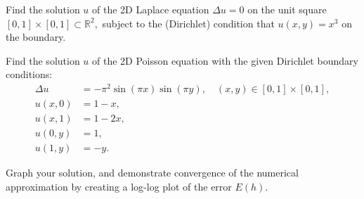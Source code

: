 % 
% 

\begin{problem}
	Find the solution $u$ of the 2D Laplace equation $\Delta u = 0$ on the unit 
	square $[0,1]\times [0,1] \subset \mathbb{R}^2,$ subject to the (Dirichlet) condition that 
	$u(x,y) = x^3$ on the boundary. 
\end{problem}

\begin{problem}
	Find the solution $u$ of the 2D Poisson equation with the given Dirichlet boundary conditions:
	\begin{align*}
		\Delta u &= -\pi^2 \sin(\pi x)\sin(\pi y), \quad (x,y) \in [0,1]\times [0,1], \\
		u(x,0) &= 1-x, \\
		u(x,1) &= 1-2x, \\
		u(0,y) &= 1, \\
		u(1,y) &= -y. 
	\end{align*}
	
	Graph your solution, and demonstrate convergence of the numerical approximation by 
	creating a log-log plot of the error $E(h).$
\end{problem}

